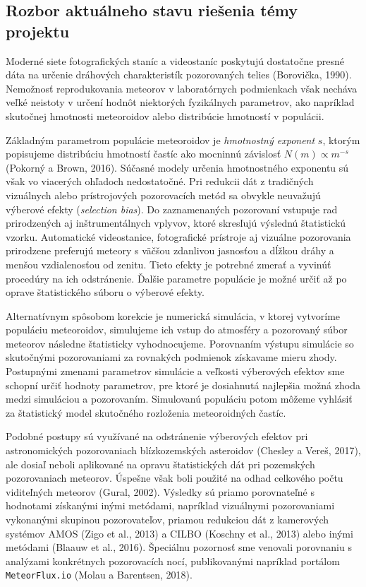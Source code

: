 \hypertarget{rozbor-aktuuxe1lneho-stavu-rieux161enia-tuxe9my-projektu}{%
\subsection{Rozbor aktuálneho stavu riešenia témy
projektu}\label{rozbor-aktuuxe1lneho-stavu-rieux161enia-tuxe9my-projektu}}

Moderné siete fotografických staníc a videostaníc poskytujú dostatočne
presné dáta na určenie dráhových charakteristík pozorovaných telies
(Borovička, 1990). Nemožnosť reprodukovania meteorov v laboratórnych
podmienkach však necháva veľké neistoty v určení hodnôt niektorých
fyzikálnych parametrov, ako napríklad skutočnej hmotnosti meteoroidov
alebo distribúcie hmotností v populácii.

Základným parametrom populácie meteoroidov je \emph{hmotnostný exponent}
\(s\), ktorým popisujeme distribúciu hmotností častíc ako mocninnú
závislosť \(N(m) \propto m^{-s}\) (Pokorný a Brown, 2016). Súčasné
modely určenia hmotnostného exponentu sú však vo viacerých ohľadoch
nedostatočné. Pri redukcii dát z tradičných vizuálnych alebo
prístrojových pozorovacích metód sa obvykle neuvažujú výberové efekty
(\emph{selection bias}). Do zaznamenaných pozorovaní vstupuje rad
prirodzených aj inštrumentálnych vplyvov, ktoré skresľujú výslednú
štatistickú vzorku. Automatické videostanice, fotografické prístroje aj
vizuálne pozorovania prirodzene preferujú meteory s väčšou zdanlivou
jasnosťou a dĺžkou dráhy a menšou vzdialenosťou od zenitu. Tieto efekty
je potrebné zmerať a vyvinúť procedúry na ich odstránenie. Ďalšie
parametre populácie je možné určiť až po oprave štatistického súboru o
výberové efekty.

Alternatívnym spôsobom korekcie je numerická simulácia, v ktorej
vytvoríme populáciu meteoroidov, simulujeme ich vstup do atmosféry a
pozorovaný súbor meteorov následne štatisticky vyhodnocujeme. Porovnaním
výstupu simulácie so skutočnými pozorovaniami za rovnakých podmienok
získavame mieru zhody. Postupnými zmenami parametrov simulácie a
veľkosti výberových efektov sme schopní určiť hodnoty parametrov, pre
ktoré je dosiahnutá najlepšia možná zhoda medzi simuláciou a
pozorovaním. Simulovanú populáciu potom môžeme vyhlásiť za štatistický
model skutočného rozloženia meteoroidných častíc.

Podobné postupy sú využívané na odstránenie výberových efektov pri
astronomických pozorovaniach blízkozemských asteroidov (Chesley a Vereš,
2017), ale dosiaľ neboli aplikované na opravu štatistických dát pri
pozemských pozorovaniach meteorov. Úspešne však boli použité na odhad
celkového počtu viditeľných meteorov (Gural, 2002). Výsledky sú priamo
porovnateľné s hodnotami získanými inými metódami, napríklad vizuálnymi
pozorovaniami vykonanými skupinou pozorovateľov, priamou redukciou dát z
kamerových systémov AMOS (Zigo et al., 2013) a CILBO (Koschny et al.,
2013) alebo inými metódami (Blaauw et al., 2016). Špeciálnu pozornosť
sme venovali porovnaniu s analýzami konkrétnych pozorovacích nocí,
publikovanými napríklad portálom \texttt{MeteorFlux.io} (Molau a
Barentsen, 2018).

